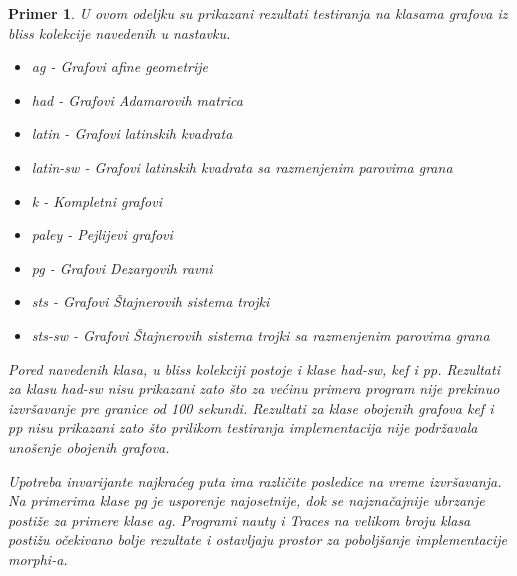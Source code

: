 \documentclass[12pt,oneside]{memoir}
\newtheorem{example}{Primer}
\theoremstyle{definition}
\begin{document}
\begin{example}
	U ovom odeljku su prikazani rezultati testiranja na klasama grafova iz
	\emph{bliss} kolekcije navedenih u nastavku.
	\begin{itemize}
		\item \emph{ag} - Grafovi afine geometrije
		\item \emph{had} - Grafovi Adamarovih matrica
		\item \emph{latin} - Grafovi latinskih kvadrata
		\item \emph{latin-sw} - Grafovi latinskih kvadrata sa razmenjenim parovima grana
		\item \emph{k} - Kompletni grafovi
		\item \emph{paley} - Pejlijevi grafovi
		\item \emph{pg} - Grafovi Dezargovih ravni
		\item \emph{sts} - Grafovi Štajnerovih sistema trojki
		\item \emph{sts-sw} - Grafovi Štajnerovih sistema trojki sa razmenjenim parovima grana
	\end{itemize}
	Pored navedenih klasa, u \emph{bliss} kolekciji postoje i klase
	\emph{had-sw}, \emph{kef} i \emph{pp}. Rezultati za klasu \emph{had-sw}
	nisu prikazani zato što za većinu primera program nije prekinuo izvršavanje
	pre granice od 100 sekundi. Rezultati za klase obojenih grafova \emph{kef}
	i \emph{pp} nisu prikazani zato što prilikom testiranja implementacija nije
	podržavala unošenje obojenih grafova.

	Upotreba invarijante najkraćeg puta ima različite posledice na vreme
	izvršavanja. Na primerima klase \emph{pg} je usporenje najosetnije, dok se
	najznačajnije ubrzanje postiže za primere klase \emph{ag}. Programi
	\emph{nauty} i \emph{Traces} na velikom broju klasa postižu očekivano bolje
	rezultate i ostavljaju prostor za poboljšanje implementacije
	\emph{morphi}-a.

	\pagebreak

	\begin{figure}[!h]
	\center
\end{figure}
\end{example}
\end{document}
